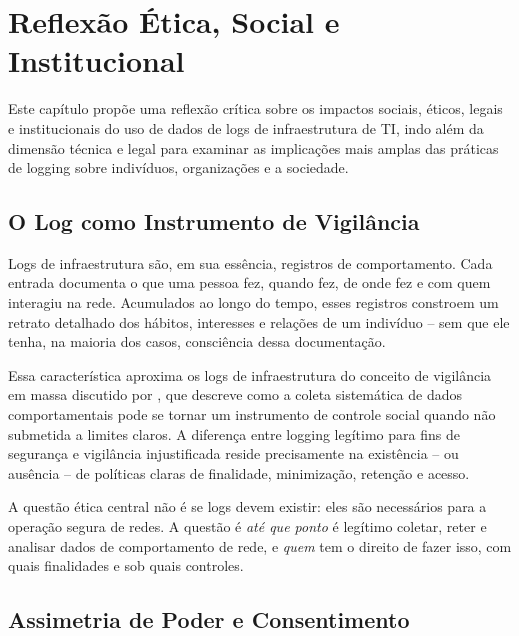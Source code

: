 
\chapter{Reflexão Ética, Social e Institucional}
\label{cap:etica}

Este capítulo propõe uma reflexão crítica sobre os impactos sociais, éticos, legais e institucionais do uso de dados de logs de infraestrutura de TI, indo além da dimensão técnica e legal para examinar as implicações mais amplas das práticas de logging sobre indivíduos, organizações e a sociedade.

\section{O Log como Instrumento de Vigilância}
\label{sec:vigilancia}

Logs de infraestrutura são, em sua essência, registros de comportamento. Cada entrada documenta o que uma pessoa fez, quando fez, de onde fez e com quem interagiu na rede. Acumulados ao longo do tempo, esses registros constroem um retrato detalhado dos hábitos, interesses e relações de um indivíduo -- sem que ele tenha, na maioria dos casos, consciência dessa documentação.

Essa característica aproxima os logs de infraestrutura do conceito de vigilância em massa discutido por , que descreve como a coleta sistemática de dados comportamentais pode se tornar um instrumento de controle social quando não submetida a limites claros. A diferença entre logging legítimo para fins de segurança e vigilância injustificada reside precisamente na existência -- ou ausência -- de políticas claras de finalidade, minimização, retenção e acesso.

A questão ética central não é se logs devem existir: eles são necessários para a operação segura de redes. A questão é \textit{até que ponto} é legítimo coletar, reter e analisar dados de comportamento de rede, e \textit{quem} tem o direito de fazer isso, com quais finalidades e sob quais controles.

\section{Assimetria de Poder e Consentimento}
\label{sec:assimetria}

